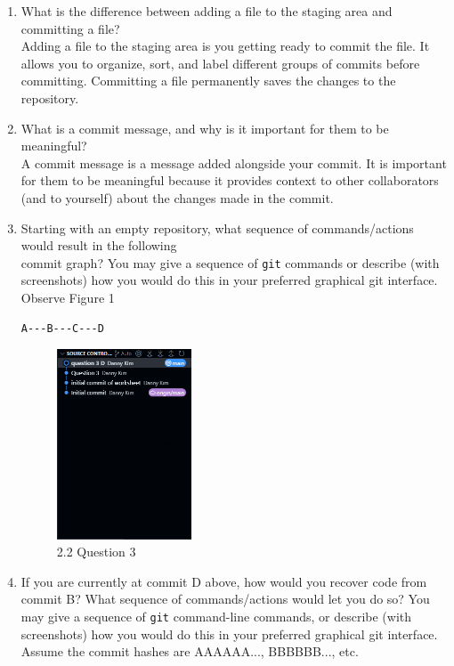 \documentclass[10pt,twocolumn]{article}
\begin{document}
\begin{enumerate}
\item What is the difference between adding a file to the staging area and committing a file?\\
Adding a file to the staging area is you getting ready to commit the file. It allows you to organize, sort, and label different groups of commits before committing. Committing a file permanently saves the changes to the repository.\\

\item What is a commit message, and why is it important for them to be meaningful?\\

A commit message is a message added alongside your commit. It is important for them to be meaningful because it provides context to other collaborators (and to yourself) about the changes made in the commit.\\

\item Starting with an empty repository, what sequence of commands/actions would result in the following \\
commit graph? You may give a sequence of \texttt{git} commands or describe (with screenshots) how you would do this in your preferred graphical git interface.\\

Observe Figure 1\\
\begin{verbatim}
A---B---C---D
\end{verbatim}

\begin{figure}[htp]
    \centering
    \includegraphics[width=4cm]{Q3.png}
    \caption{2.2 Question 3}
\end{figure}

\item If you are currently at commit D above, how would you recover code from commit B? What sequence of commands/actions would let you do so? You may give a sequence of \texttt{git} command-line commands, or describe (with screenshots) how you would do this in your preferred graphical git interface. Assume the commit hashes are AAAAAA..., BBBBBB..., etc.\\


\end{enumerate}
\end{document}

